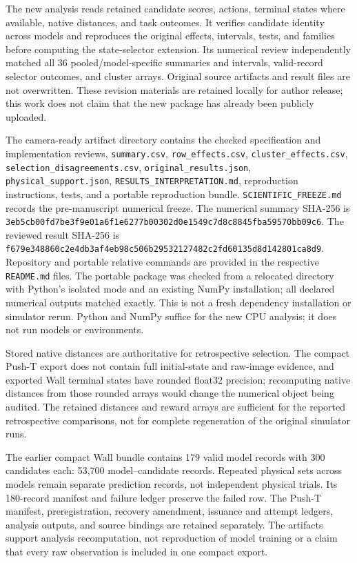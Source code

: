 \documentclass{article}
\begin{document}
The new analysis reads retained candidate scores, actions, terminal states
where available, native distances, and task outcomes. It verifies candidate
identity across models and reproduces the original effects, intervals, tests,
and families before computing the state-selector extension. Its numerical
review independently matched all 36 pooled/model-specific summaries and
intervals, valid-record selector outcomes, and cluster arrays. Original source
artifacts and result files are not overwritten.
These revision materials are retained locally for author release; this work
does not claim that the new package has already been publicly uploaded.

The camera-ready artifact directory
 contains the checked specification
and implementation reviews, \texttt{summary.csv}, \texttt{row\_effects.csv},
\texttt{cluster\_effects.csv}, \texttt{selection\_disagreements.csv},
\texttt{original\_results.json}, \texttt{physical\_support.json},
\texttt{RESULTS\_INTERPRETATION.md}, reproduction instructions, tests, and a
portable reproduction bundle. \texttt{SCIENTIFIC\_FREEZE.md} records the
pre-manuscript numerical freeze. The numerical summary SHA-256 is
\texttt{3eb5cb00fd7be3f9e01a6f1e6277b003}\allowbreak\texttt{02d0e1549c7d8c8845fba59570bb09c6}.
The reviewed result SHA-256 is
\texttt{f679e348860c2e4db3af4eb98c506b29}\allowbreak\texttt{532127482c2fd60135d8d142801ca8d9}.
Repository and portable relative commands are provided in the respective
\texttt{README.md} files. The portable package was checked from a relocated
directory with Python's isolated mode and an existing NumPy installation;
all declared numerical outputs matched exactly. This is not a fresh dependency
installation or simulator rerun. Python and NumPy suffice for the new CPU analysis;
it does not run models or environments.

Stored native distances are authoritative for retrospective selection.
The compact Push-T export does not contain full initial-state and raw-image
evidence, and exported Wall terminal states have rounded float32 precision;
recomputing native distances from those rounded arrays would change the
numerical object being audited. The retained distances and reward arrays
are sufficient for the reported retrospective comparisons, not for complete
regeneration of the original simulator runs.

The earlier compact Wall bundle contains 179 valid model records with 300
candidates each: 53,700 model--candidate records. Repeated physical sets
across models remain separate prediction records, not independent physical
trials. Its 180-record manifest and failure ledger preserve the failed row.
The Push-T manifest, preregistration, recovery amendment, issuance and attempt
ledgers, analysis outputs, and source bindings are retained separately. The
artifacts support analysis recomputation, not reproduction of model training
or a claim that every raw observation is included in one compact export.
\end{document}
